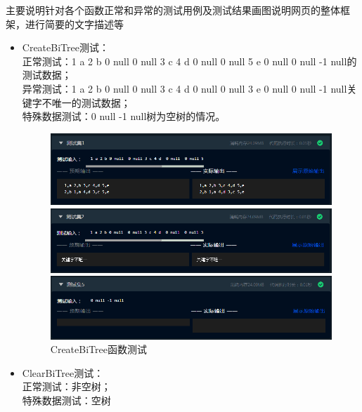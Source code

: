 \documentclass[supercite]{Experimental_Report}
\theoremstyle{definition}
\begin{document}
主要说明针对各个函数正常和异常的测试用例及测试结果画图说明网页的整体框架，进行简要的文字描述等
\begin{itemize}
	\item CreateBiTree测试：\\正常测试：1 a 2 b 0 null  0 null 3 c 4 d  0 null  0 null 5 e  0 null  0 null -1 null的测试数据；\\异常测试：1 a 2 b 0 null  0 null 3 c 4 d  0 null  0 null 3 e  0 null  0 null -1 null关键字不唯一的测试数据；\\
	      特殊数据测试：0 null -1 null树为空树的情况。
	      \begin{figure}[htbp]
		      \centering
		      \begin{minipage}{0.9\linewidth}
			      \centering
			      \includegraphics[width=0.9\linewidth]{images/test-56.png}
		      \end{minipage}
		      \begin{minipage}{0.9\linewidth}
			      \centering
			      \includegraphics[width=0.9\linewidth]{images/test-57.png}
		      \end{minipage}
		      \begin{minipage}{0.9\linewidth}
			      \centering
			      \includegraphics[width=0.9\linewidth]{images/test-58.png}
		      \end{minipage}
		      \caption{CreateBiTree函数测试}
		      \label{fig2-4}
	      \end{figure}
	\item ClearBiTree测试：\\正常测试：非空树；\\特殊数据测试：空树

\end{itemize}
\end{document}
